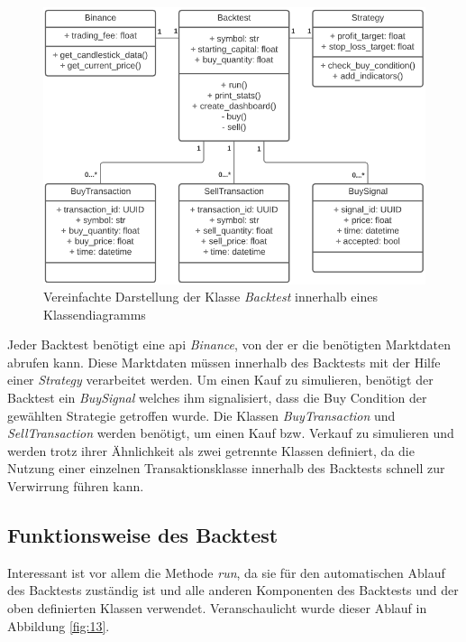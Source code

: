 \documentclass[oneside]{ausarbeitung}
\begin{document}
\begin{figure}[H]
  \centering
  \includegraphics[height=0.48\textheight]{uml/backtest_uml.png}
  \caption{Vereinfachte Darstellung der Klasse \textit{Backtest} innerhalb eines 		Klassendiagramms}
  \label{fig:12}
\end{figure}

Jeder Backtest benötigt eine \ac{api} \textit{Binance}, von der er die benötigten Marktdaten abrufen kann. Diese Marktdaten müssen innerhalb des Backtests mit der Hilfe einer \textit{Strategy} verarbeitet werden. Um einen Kauf zu simulieren, benötigt der Backtest ein \textit{BuySignal} welches ihm signalisiert, dass die Buy Condition der gewählten Strategie getroffen wurde. Die Klassen \textit{BuyTransaction} und \textit{SellTransaction} werden benötigt, um einen Kauf bzw. Verkauf zu simulieren und werden trotz ihrer Ähnlichkeit als zwei getrennte Klassen definiert, da die Nutzung einer einzelnen Transaktionsklasse innerhalb des Backtests schnell zur Verwirrung führen kann.

\subsection{Funktionsweise des Backtest}
\label{sub:funktionsweise_des_backtest}

Interessant ist vor allem die Methode \textit{run}, da sie für den automatischen Ablauf des Backtests zuständig ist und alle anderen Komponenten des Backtests und der oben definierten Klassen verwendet. Veranschaulicht wurde dieser Ablauf in Abbildung \ref{fig:13}.
\end{document}

